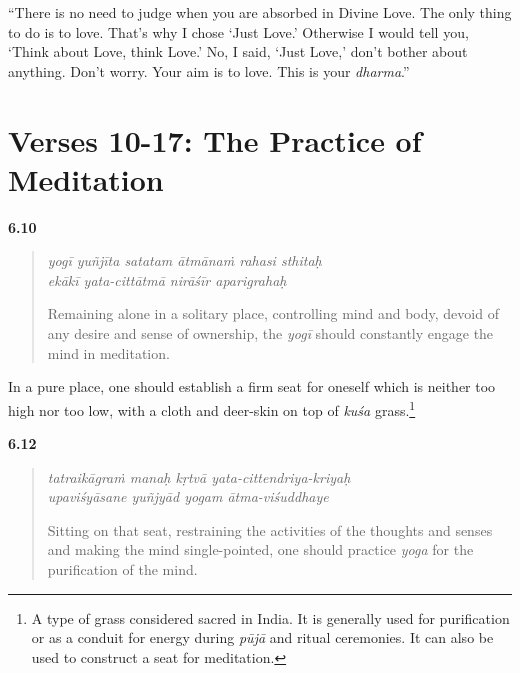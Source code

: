 \enquote{There is no need to judge when you are absorbed in Divine Love. The only thing to do is to love. That’s why I chose \enquote{Just Love.} Otherwise I would tell you, \enquote{Think about Love, think Love.} No, I said, \enquote{Just Love,} don’t bother about anything. Don’t worry. Your aim is to love. This is your \textit{dharma}.}

\section{Verses 10-17: The Practice of Meditation}\label{sec-verses-10-17-the-practice-of-meditation}

\par\noindent\textbf{6.10}\par
\begin{verse}
\textit{yogī yuñjīta satatam ātmānaṁ rahasi sthitaḥ} \\
\textit{ekākī yata-cittātmā nirāśīr aparigrahaḥ}

\noindent Remaining alone in a solitary place, controlling mind and body, devoid of any desire and sense of ownership, the \textit{yogī} should constantly engage the mind in meditation.
\end{verse}
\par


{In a pure place, one should establish a firm seat for oneself which is neither too high nor too low, with a cloth and deer-skin on top of \textit{kuśa} grass.\footnote{A type of grass considered sacred in India. It is generally used for purification or as a conduit for energy during \textit{pūjā} and ritual ceremonies. It can also be used to construct a seat for meditation.}}


\par\noindent\textbf{6.12}\par
\begin{verse}
\textit{tatraikāgraṁ manaḥ kṛtvā yata-cittendriya-kriyaḥ} \\
\textit{upaviśyāsane yuñjyād yogam ātma-viśuddhaye}

\noindent Sitting on that seat, restraining the activities of the thoughts and senses and making the mind single-pointed, one should practice \textit{yoga} for the purification of the mind.
\end{verse}
\par



